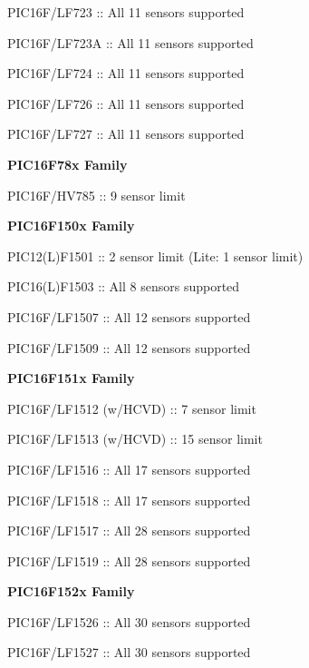 \begin{DoxyItemize}
\begin{DoxyItemize}
\item P\+I\+C16\+F/\+L\+F723 \+:\+: All 11 sensors supported 
\item P\+I\+C16\+F/\+L\+F723\+A \+:\+: All 11 sensors supported 
\item P\+I\+C16\+F/\+L\+F724 \+:\+: All 11 sensors supported 
\item P\+I\+C16\+F/\+L\+F726 \+:\+: All 11 sensors supported 
\item P\+I\+C16\+F/\+L\+F727 \+:\+: All 11 sensors supported 
\end{DoxyItemize}\item {\bfseries P\+I\+C16\+F78x Family} 
\begin{DoxyItemize}
\item P\+I\+C16\+F/\+H\+V785 \+:\+: 9 sensor limit 
\end{DoxyItemize}\item {\bfseries P\+I\+C16\+F150x Family} 
\begin{DoxyItemize}
\item P\+I\+C12(\+L)F1501 \+:\+: 2 sensor limit (Lite\+: 1 sensor limit) 
\item P\+I\+C16(\+L)F1503 \+:\+: All 8 sensors supported 
\item P\+I\+C16\+F/\+L\+F1507 \+:\+: All 12 sensors supported 
\item P\+I\+C16\+F/\+L\+F1509 \+:\+: All 12 sensors supported 
\end{DoxyItemize}\item {\bfseries P\+I\+C16\+F151x Family} 
\begin{DoxyItemize}
\item P\+I\+C16\+F/\+L\+F1512 (w/\+H\+C\+V\+D) \+:\+: 7 sensor limit 
\item P\+I\+C16\+F/\+L\+F1513 (w/\+H\+C\+V\+D) \+:\+: 15 sensor limit 
\item P\+I\+C16\+F/\+L\+F1516 \+:\+: All 17 sensors supported 
\item P\+I\+C16\+F/\+L\+F1518 \+:\+: All 17 sensors supported 
\item P\+I\+C16\+F/\+L\+F1517 \+:\+: All 28 sensors supported 
\item P\+I\+C16\+F/\+L\+F1519 \+:\+: All 28 sensors supported 
\end{DoxyItemize}\item {\bfseries P\+I\+C16\+F152x Family} 
\begin{DoxyItemize}
\item P\+I\+C16\+F/\+L\+F1526 \+:\+: All 30 sensors supported 
\item P\+I\+C16\+F/\+L\+F1527 \+:\+: All 30 sensors supported 

\end{DoxyItemize}
\end{DoxyItemize}
